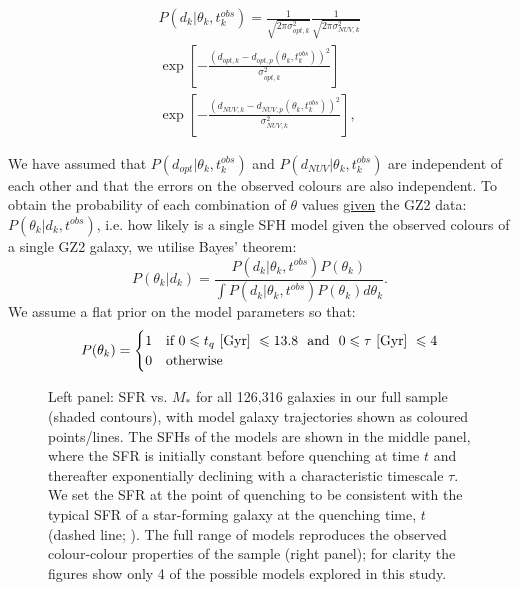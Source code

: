 \documentclass[useAMS,usenatbib]{mn2e}
\def\changed    {\color{titlecol} }
\begin{document}
\begin{multline}\label{like}
P(d_{k}|\theta_k, t^{obs}_{k}) = \frac{1}{\sqrt{2\pi\sigma_{opt, k}^2}}\frac{1}{\sqrt{2\pi\sigma_{NUV, k}^2}} \\ \exp{\left[ - \frac{(d_{opt, k} - d_{opt, p}(\theta_k, t_{k}^{obs}))^2}{\sigma_{opt, k}^2} \right]} \\ \exp{\left[ - \frac{(d_{NUV, k} - d_{NUV, p}(\theta_k, t_{k}^{obs}))^2}{\sigma_{NUV, k}^2} \right]},
\end{multline}


We have assumed that $P(d_{opt}|\theta_k, t^{obs}_{k})$ and $P(d_{NUV}|\theta_k, t^{obs}_{k})$ are independent of each other and that the errors on the observed colours are also independent. To obtain the probability of each combination of $\theta$ values \underline{given} the GZ2 data: $P(\theta_k|d_k, t^{obs})$, i.e. how likely is a single SFH model given the observed colours of a single GZ2 galaxy, {\changed we utilise Bayes' theorem}:
{\changed \begin{equation}\label{big}
P(\theta_k|d_k) = \frac{P(d_k|\theta_k, t^{obs})P(\theta_k)}{\int P(d_k |\theta_k, t^{obs})P(\theta_k) d\theta_k}.
\end{equation}}
{\changed We assume a flat prior on the model parameters so that:
\begin{equation}\label{prior}
P(\theta_k) =
\begin{cases}
1 & \text{if } 0 \leq t_q ~\rm{[Gyr]}~ \leq 13.8 ~  \text{ and } ~ 0 \leq \tau  ~\rm{[Gyr]}~ \leq 4\\
0 & \text{otherwise} \\
\end{cases}
\end{equation}}

\begin{figure}
\caption{Left panel: SFR vs. $M_*$ for all 126,316 galaxies in our full sample (shaded contours), with model galaxy trajectories shown as coloured points/lines. The SFHs of the models are shown in the middle panel, where the SFR is initially constant before quenching at time $t$ and thereafter exponentially declining with a characteristic timescale $\tau$. We set the SFR at the point of quenching to be consistent with the typical SFR of a star-forming galaxy at the quenching time, $t$ (dashed line; \citealt{Peng}). The full range of models reproduces the observed colour-colour properties of the sample (right panel); for clarity the figures show only 4 of the possible models explored in this study.}
\label{sfr_mass_col}
\end{figure}
\end{document}

